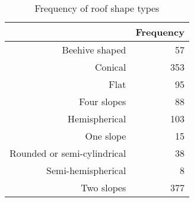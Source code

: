 \begin{table}[ht]
\centering
\begin{tabular}{rr}
  \hline
 & Frequency \\ 
  \hline
Beehive shaped &  57 \\ 
  Conical & 353 \\ 
  Flat &  95 \\ 
  Four slopes &  88 \\ 
  Hemispherical & 103 \\ 
  One slope &  15 \\ 
  Rounded or semi-cylindrical &  38 \\ 
  Semi-hemispherical &   8 \\ 
  Two slopes & 377 \\ 
   \hline
\end{tabular}
\caption{Frequency of roof shape types} 
\label{roofFreq}
\end{table}
